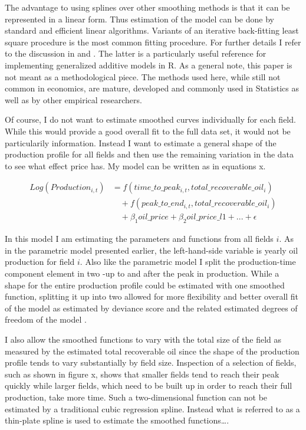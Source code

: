 \documentclass[12pt]{scrartcl} %
\begin{document}
The advantage to using splines over other smoothing methods is that it can be represented in a linear form.  Thus estimation of the model can be done by standard and efficient linear algorithms.  Variants of an iterative back-fitting least square procedure is the most common fitting procedure.  For further details I refer to the discussion in \citet{tsibriani90} and \citet{wood04}.  The latter is a particularly useful reference for implementing generalized additive models in R.  As a general note, this paper is not meant as a methodological piece.  The methods used here, while still not common in economics, are mature, developed and commonly used in Statistics as well as by other empirical researchers.

Of course, I do not want to estimate smoothed curves individually for each field.  While this would provide a good overall fit to the full data set, it would not be particularily information.  Instead I want to estimate a general shape of the production profile for all fields and then use the remaining variation in the data to see what effect price has.  My model can be written as in equations x.

\begin{equation}
\begin{split}
	Log(Production_{i,t})&=f(time\_to\_peak_{i,t}, total\_recoverable\_oil_i) \\
	& \quad + f(peak\_to\_end_{i,t}, total\_recoverable\_oil_i) \\
	& \quad + \beta_1 oil\_price + \beta_2 oil\_price\_l1 + ... +  \epsilon
\end{split}
\end{equation}

In this model I am estimating the parameters and functions from all fields $i$. As in the parametric model presented earlier, the left-hand-side variable is yearly oil production for field $i$. Also like the parametric model I split the production-time component element in two -up to and after the peak in production.  While a shape for the entire production profile could be estimated with one smoothed function, splitting it up into two allowed for more flexibility and better overall fit of the model as estimated by deviance score and the related estimated degrees of freedom of the model \citet[p.xx]{wood04}.  

 I also allow the smoothed functions to vary with the total size of the field as measured by the estimated total recoverable oil since the shape of the production profile tends to vary substantially by field size.  Inspection of a selection of fields, such as shown in figure x, shows that smaller fields tend to reach their peak quickly while larger fields, which need to be built up in order to reach their full production, take more time.   Such a two-dimensional function can not be estimated by a traditional cubic regression spline.  Instead what is referred to as a thin-plate spline is used to estimate the smoothed functions….
\end{document}
